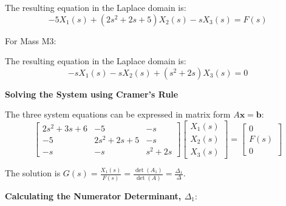 \documentclass[11pt]{article}
\begin{document}
The resulting equation in the Laplace domain is:
\begin{equation}
-5X_1(s) + (2s^2 + 2s + 5)X_2(s) - sX_3(s) = F(s) \tag{2}
\end{equation}

{For Mass M3:}
\begin{figure}[h!]
\centering
{}
\end{figure}


The resulting equation in the Laplace domain is:
\begin{equation}
-sX_1(s) - sX_2(s) + (s^2 + 2s)X_3(s) = 0 \tag{3}
\end{equation}

\noindent\textbf{Solving the System using Cramer's Rule}
\vspace{12pt}

The three system equations can be expressed in matrix form $A\mathbf{x} = \mathbf{b}$:
$$
\begin{bmatrix}
2s^2 + 3s + 6 & -5 & -s \\
-5 & 2s^2 + 2s + 5 & -s \\
-s & -s & s^2 + 2s
\end{bmatrix}
\begin{bmatrix}
X_1(s) \\
X_2(s) \\
X_3(s)
\end{bmatrix}
=
\begin{bmatrix}
0 \\
F(s) \\
0
\end{bmatrix}
$$

The solution is $G(s) = \frac{X_1(s)}{F(s)} = \frac{\det(A_1)}{\det(A)} = \frac{\Delta_1}{\Delta}$.

\vspace{12pt}
\noindent\textbf{Calculating the Numerator Determinant, $\Delta_1$}:
\vspace{12pt}
\end{document}
